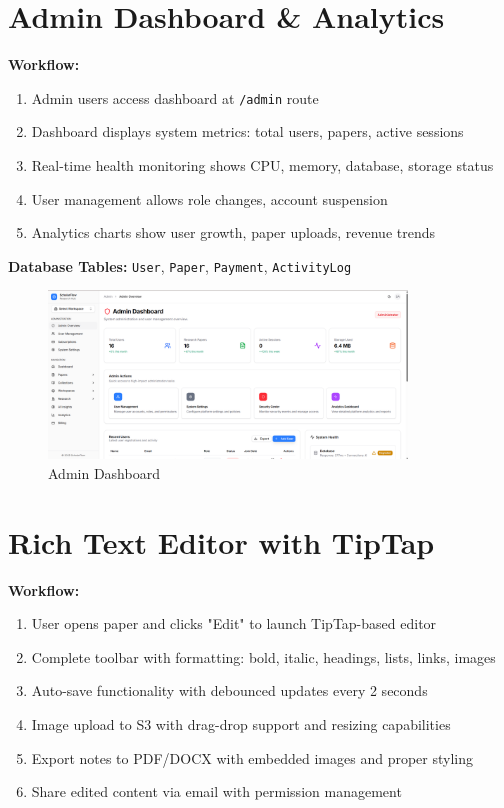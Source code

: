 \section{Admin Dashboard \& Analytics}

\textbf{Workflow:}
\begin{enumerate}[leftmargin=*,topsep=3pt,itemsep=2pt]
    \item Admin users access dashboard at \texttt{/admin} route
    \item Dashboard displays system metrics: total users, papers, active sessions
    \item Real-time health monitoring shows CPU, memory, database, storage status
    \item User management allows role changes, account suspension
    \item Analytics charts show user growth, paper uploads, revenue trends
\end{enumerate}

\textbf{Database Tables:} \texttt{User}, \texttt{Paper}, \texttt{Payment}, \texttt{ActivityLog}

\begin{figure}[H]
\centering
\includegraphics[width=0.85\textwidth]{images/screenshots/admin_overview.png}
\caption{Admin Dashboard}
\label{fig:admin}
\end{figure}

\section{Rich Text Editor with TipTap}

\textbf{Workflow:}
\begin{enumerate}[leftmargin=*,topsep=3pt,itemsep=2pt]
    \item User opens paper and clicks "Edit" to launch TipTap-based editor
    \item Complete toolbar with formatting: bold, italic, headings, lists, links, images
    \item Auto-save functionality with debounced updates every 2 seconds
    \item Image upload to S3 with drag-drop support and resizing capabilities
    \item Export notes to PDF/DOCX with embedded images and proper styling
    \item Share edited content via email with permission management
\end{enumerate}

